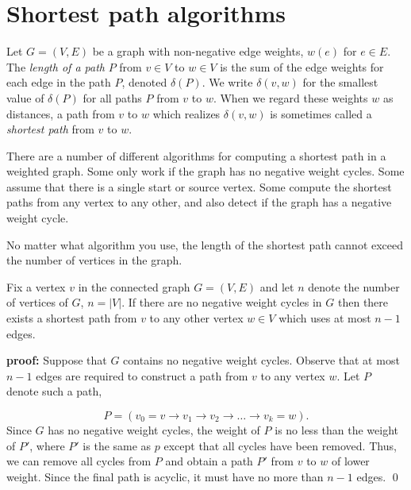 
\section{Shortest path algorithms}


Let $G = (V,E)$ be a graph with non-negative edge weights, $w(e)$ for
$e \in E$. The \emph{length of a path} $P$ from $v \in V$ to $w \in V$ is the sum of
the edge weights for each edge in the path $P$, denoted
$\delta(P)$. We write $\delta(v,w)$ for the smallest value of
$\delta(P)$ for all paths $P$ from $v$ to $w$.
When we regard these weights $w$ as distances,
a path from $v$ to $w$ which realizes $\delta(v,w)$ is
sometimes called a {\it shortest path} from $v$ to $w$.

There are a number of different algorithms for computing a shortest
path in a weighted graph. Some only work if the graph has
no negative weight cycles. Some assume that there is a single
start or source vertex. Some compute the shortest paths from
any vertex to any other, and also detect if the graph has
a negative weight cycle.

No matter what algorithm you use, the length of the shortest path
cannot exceed the number of vertices in the graph.

\begin{lemma}
\label{lemma:shortest-path}
{\rm
Fix a vertex $v$ in the connected graph $G=(V,E)$ and let $n$ denote the
number of vertices of $G$, $n=|V|$.
If there are no negative weight cycles in $G$ then there
exists a shortest path from $v$
to any other vertex $w\in V$ which uses at most $n-1$ edges.
}
\end{lemma}

{\bf proof:}
Suppose that $G$ contains no negative weight cycles.
Observe that at most $n-1$ edges are required to construct a
path from $v$ to any vertex $w$. Let $P$ denote such a path,

\[
P = (v_0=v\to v_1 \to v_2 \to \dots \to v_k = w).
\]
Since $G$ has no negative weight cycles, the weight of $P$ is no less
than the weight of $P'$, where
$P'$ is the same as $p$ except that all cycles have been removed.
Thus, we can remove all cycles from $P$ and obtain a path $P'$
from $v$ to $w$ of lower weight. Since the
final path is acyclic, it must have no more than $n-1$ edges.
\qed


